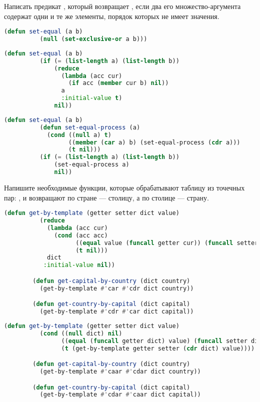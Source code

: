 \documentclass[a4paper,oneside,12pt]{extreport}
\begin{document}


\begin{task}
	Написать предикат , который возвращает , если два его множество-аргумента содержат одни и те же элементы, порядок которых не имеет значения.

	\begin{lstlisting}[language=Lisp, gobble=16]
		(defun set-equal (a b)
		  (null (set-exclusive-or a b)))
	\end{lstlisting}

	\begin{lstlisting}[language=Lisp, gobble=16]
		(defun set-equal (a b)
		  (if (= (list-length a) (list-length b))
		      (reduce
		        (lambda (acc cur)
		          (if acc (member cur b) nil))
		        a
		        :initial-value t)
		      nil))
	\end{lstlisting}

	\begin{lstlisting}[language=Lisp, gobble=16]
		(defun set-equal (a b)
		  (defun set-equal-process (a)
		    (cond ((null a) t)
		          ((member (car a) b) (set-equal-process (cdr a)))
		          (t nil)))
		  (if (= (list-length a) (list-length b))
		      (set-equal-process a)
		      nil))
	\end{lstlisting}
\end{task}

\begin{task}
	Напишите необходимые функции, которые обрабатывают таблицу из точечных пар: , и возвращают по стране — столицу, а по столице — страну.

	\begin{lstlisting}[language=Lisp, gobble=16]
		(defun get-by-template (getter setter dict value)
		  (reduce
		    (lambda (acc cur)
		      (cond (acc acc)
		            ((equal value (funcall getter cur)) (funcall setter cur))
		            (t nil)))
		    dict
		   :initial-value nil))

		(defun get-capital-by-country (dict country)
		  (get-by-template #'car #'cdr dict country))

		(defun get-country-by-capital (dict capital)
		  (get-by-template #'cdr #'car dict capital))
	\end{lstlisting}

	\begin{lstlisting}[language=Lisp, gobble=16]
		(defun get-by-template (getter setter dict value)
		  (cond ((null dict) nil)
		        ((equal (funcall getter dict) value) (funcall setter dict))
		        (t (get-by-template getter setter (cdr dict) value))))

		(defun get-capital-by-country (dict country)
		  (get-by-template #'caar #'cdar dict country))

		(defun get-country-by-capital (dict capital)
		  (get-by-template #'cdar #'caar dict capital))
	\end{lstlisting}
\end{task}
\end{document}
